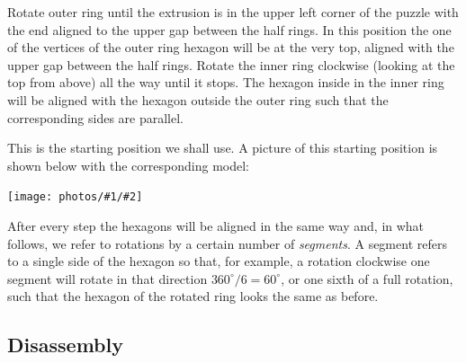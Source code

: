\documentclass{article}
\newcommand{\photo}[3]{
      \begin{center}
            \texttt{[image: photos/\#1/\#2]}
      \end{center}
}
\begin{document}
Rotate outer ring until the extrusion is in the upper left corner of the puzzle with the end aligned to the upper gap between the half rings.
In this position the one of the vertices of the outer ring hexagon will be at the very top, aligned with the upper gap between the half rings.
Rotate the inner ring clockwise (looking at the top from above) all the way until it stops.
The hexagon inside in the inner ring will be aligned with the hexagon outside the outer ring such that the corresponding sides are parallel.

This is the starting position we shall use.
A picture of this starting position is shown below with the corresponding model:
\photo{valve}{starting-position}{1.5}
After every step the hexagons will be aligned in the same way and, in what follows, we refer to rotations by a certain number of \emph{segments}.
A segment refers to a single side of the hexagon so that, for example, a rotation clockwise one segment will rotate in that direction $360^\circ / 6 = 60^\circ$, or one sixth of a full rotation, such that the hexagon of the rotated ring looks the same as before.

\subsection{Disassembly}
\end{document}
